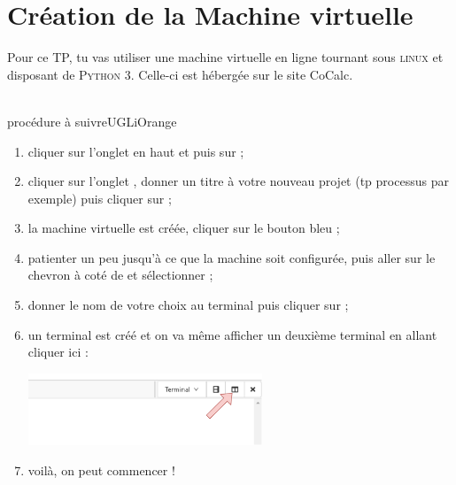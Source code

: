 \documentclass[a4paper,12pt,french]{book}
\begin{document}
\section*{Création de la Machine virtuelle}

Pour ce TP, tu vas utiliser une machine virtuelle en ligne tournant sous \textsc{linux} et disposant de \textsc{Python 3}. Celle-ci est hébergée sur le site CoCalc.\\

\\


\begin{encadrecolore}{procédure à suivre}{UGLiOrange}
\begin{enumerate}
    \item cliquer sur l'onglet  en haut et puis sur  ;
    \item cliquer sur l'onglet , donner un titre à votre nouveau projet (tp processus par exemple) puis cliquer sur  ;
    \item la machine virtuelle est créée, cliquer sur le bouton bleu  ;
    \item patienter un peu jusqu'à ce que la machine soit configurée, puis aller sur le chevron à coté de  et sélectionner  ;
    \item donner le nom de votre choix au terminal puis cliquer sur  ;
    \item un terminal est créé et on va même afficher un deuxième terminal en allant cliquer ici :
    \begin{center}
    \includegraphics[width=7cm]{img/CoCalc2.png}
    \end{center}
    \item voilà, on peut commencer !
\end{enumerate}

\end{encadrecolore}
\newpage
\end{document}
